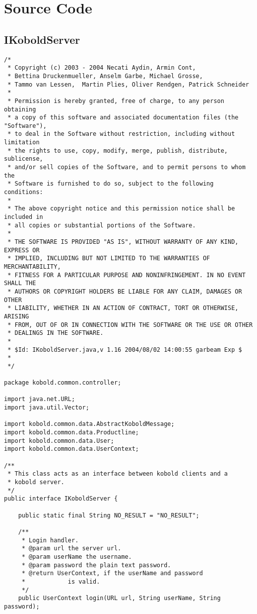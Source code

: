 \chapter{Source Code}
\section{IKoboldServer}
\small \begin{verbatim}
/*
 * Copyright (c) 2003 - 2004 Necati Aydin, Armin Cont, 
 * Bettina Druckenmueller, Anselm Garbe, Michael Grosse, 
 * Tammo van Lessen,  Martin Plies, Oliver Rendgen, Patrick Schneider
 * 
 * Permission is hereby granted, free of charge, to any person obtaining
 * a copy of this software and associated documentation files (the "Software"),
 * to deal in the Software without restriction, including without limitation
 * the rights to use, copy, modify, merge, publish, distribute, sublicense, 
 * and/or sell copies of the Software, and to permit persons to whom the 
 * Software is furnished to do so, subject to the following conditions:
 *
 * The above copyright notice and this permission notice shall be included in 
 * all copies or substantial portions of the Software.
 *
 * THE SOFTWARE IS PROVIDED "AS IS", WITHOUT WARRANTY OF ANY KIND, EXPRESS OR 
 * IMPLIED, INCLUDING BUT NOT LIMITED TO THE WARRANTIES OF MERCHANTABILITY, 
 * FITNESS FOR A PARTICULAR PURPOSE AND NONINFRINGEMENT. IN NO EVENT SHALL THE 
 * AUTHORS OR COPYRIGHT HOLDERS BE LIABLE FOR ANY CLAIM, DAMAGES OR OTHER 
 * LIABILITY, WHETHER IN AN ACTION OF CONTRACT, TORT OR OTHERWISE, ARISING 
 * FROM, OUT OF OR IN CONNECTION WITH THE SOFTWARE OR THE USE OR OTHER 
 * DEALINGS IN THE SOFTWARE.
 *
 * $Id: IKoboldServer.java,v 1.16 2004/08/02 14:00:55 garbeam Exp $
 *
 */

package kobold.common.controller;

import java.net.URL;
import java.util.Vector;

import kobold.common.data.AbstractKoboldMessage;
import kobold.common.data.Productline;
import kobold.common.data.User;
import kobold.common.data.UserContext;

/**
 * This class acts as an interface between kobold clients and a
 * kobold server.
 */
public interface IKoboldServer {
	
	public static final String NO_RESULT = "NO_RESULT";

	/**
	 * Login handler.
	 * @param url the server url.
	 * @param userName the username.
	 * @param password the plain text password.
	 * @return UserContext, if the userName and password
	 * 			  is valid. 
	 */
    public UserContext login(URL url, String userName, String password);


\end{verbatim}
